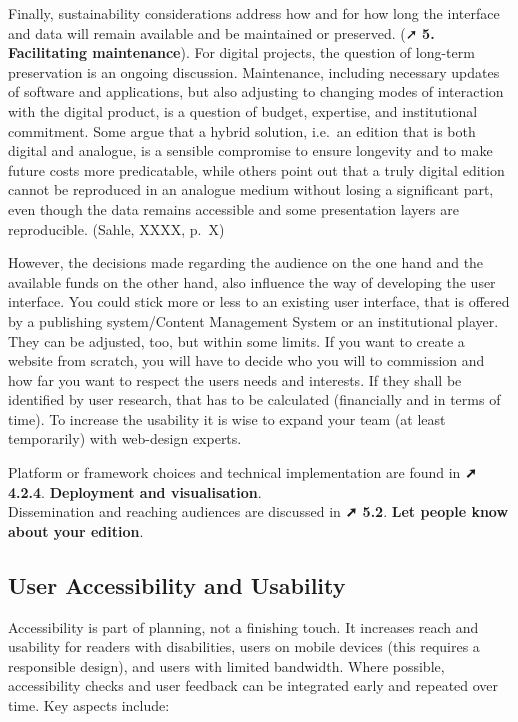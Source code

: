 \documentclass[
  letterpaper,
  DIV=11,
  numbers=noendperiod]{scrreprt}
\begin{document}
Finally, sustainability considerations address how and for how long the
interface and data will remain available and be maintained or preserved.
(➚ \textbf{5. Facilitating maintenance}). For digital projects, the
question of long-term preservation is an ongoing discussion.
Maintenance, including necessary updates of software and applications,
but also adjusting to changing modes of interaction with the digital
product, is a question of budget, expertise, and institutional
commitment. Some argue that a hybrid solution, i.e.~an edition that is
both digital and analogue, is a sensible compromise to ensure longevity
and to make future costs more predicatable, while others point out that
a truly digital edition cannot be reproduced in an analogue medium
without losing a significant part, even though the data remains
accessible and some presentation layers are reproducible. (Sahle, XXXX,
p.~X)

However, the decisions made regarding the audience on the one hand and
the available funds on the other hand, also influence the way of
developing the user interface. You could stick more or less to an
existing user interface, that is offered by a publishing system/Content
Management System or an institutional player. They can be adjusted, too,
but within some limits. If you want to create a website from scratch,
you will have to decide who you will to commission and how far you want
to respect the users\textquotesingle{} needs and interests. If they
shall be identified by user research, that has to be calculated
(financially and in terms of time). To increase the usability it is wise
to expand your team (at least temporarily) with web-design experts.

Platform or framework choices and technical implementation are found in
\textbf{➚ 4.2.4}. \textbf{Deployment and visualisation}.\\
Dissemination and reaching audiences are discussed in \textbf{➚ 5.2}.
\textbf{Let people know about your edition}.

\subsection{User Accessibility and
Usability}\label{user-accessibility-and-usability}

Accessibility is part of planning, not a finishing touch. It increases
reach and usability for readers with disabilities, users on mobile
devices (this requires a responsible design), and users with limited
bandwidth. Where possible, accessibility checks and user feedback can be
integrated early and repeated over time. Key aspects include:
\end{document}
